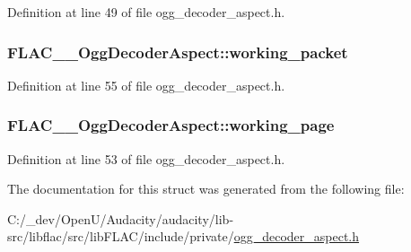 Definition at line 49 of file ogg\+\_\+decoder\+\_\+aspect.\+h.

\subsubsection[{\texorpdfstring{working\+\_\+packet}{working_packet}}]{ F\+L\+A\+C\+\_\+\+\_\+\+Ogg\+Decoder\+Aspect\+::working\+\_\+packet}\hypertarget{struct_f_l_a_c_____ogg_decoder_aspect_a1cf1159682cc9efc7597d426fcf2bdf4}{}\label{struct_f_l_a_c_____ogg_decoder_aspect_a1cf1159682cc9efc7597d426fcf2bdf4}


Definition at line 55 of file ogg\+\_\+decoder\+\_\+aspect.\+h.

\subsubsection[{\texorpdfstring{working\+\_\+page}{working_page}}]{ F\+L\+A\+C\+\_\+\+\_\+\+Ogg\+Decoder\+Aspect\+::working\+\_\+page}\hypertarget{struct_f_l_a_c_____ogg_decoder_aspect_a10e8b43565637bff6c560be3530a5327}{}\label{struct_f_l_a_c_____ogg_decoder_aspect_a10e8b43565637bff6c560be3530a5327}


Definition at line 53 of file ogg\+\_\+decoder\+\_\+aspect.\+h.



The documentation for this struct was generated from the following file\+:\begin{DoxyCompactItemize}
\item 
C\+:/\+\_\+dev/\+Open\+U/\+Audacity/audacity/lib-\/src/libflac/src/lib\+F\+L\+A\+C/include/private/\hyperlink{ogg__decoder__aspect_8h}{ogg\+\_\+decoder\+\_\+aspect.\+h}\end{DoxyCompactItemize}
